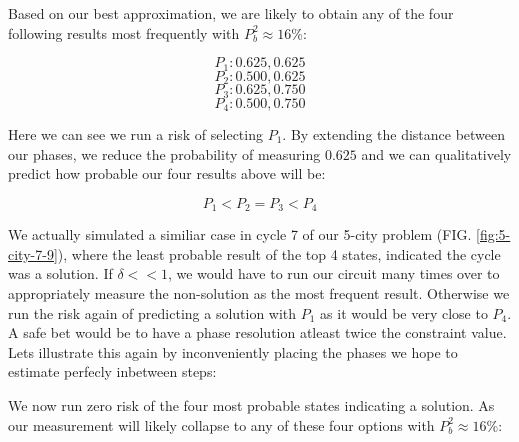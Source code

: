 \documentclass[msc,oneside]{ubcthesis}
\begin{document}
	
	Based on our best approximation, we are likely to obtain any of the four following results most frequently with $P^2_b  \approx 16\%$:

	$$P_1: 0.625, 0.625$$
	$$P_2: 0.500, 0.625$$
	$$P_3: 0.625, 0.750$$
	$$P_4: 0.500, 0.750$$
	
	Here we can see we run a risk of selecting $P_1$. By extending the distance between our phases, we reduce the probability of measuring $0.625$ and we can qualitatively predict how probable our four results above will be:
	
	
 $$P_1 < P_2 = P_3 < P_4$$
 
 We actually simulated a similiar case in cycle 7 of our 5-city problem (FIG. \ref{fig:5-city-7-9}), where the least probable result of the top 4 states, indicated the cycle was a solution.  If $\delta << 1$, we would have to run our circuit many times over to appropriately measure the non-solution as the most frequent result. Otherwise we run the risk again of predicting a solution with $P_1$ as it would be very close to $P_4$. A safe bet would be to have a phase resolution atleast twice the constraint value. Lets illustrate this again by inconveniently placing the phases we hope to estimate perfecly inbetween steps:
 
 
 We now run zero risk of the four most probable states indicating a solution. As our measurement will likely collapse to any of these four options with $P^2_b  \approx 16\%$:
 
\end{document}
